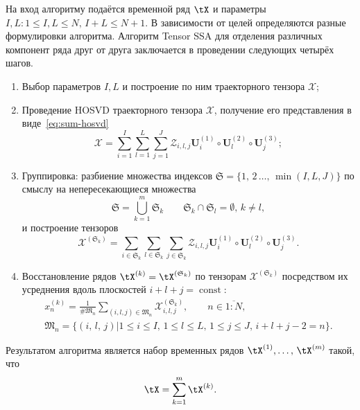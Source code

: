 \documentclass[specialist,
    substylefile = spbu_report.rtx,
    subf,href,colorlinks=true, 12pt]{disser}
\theoremstyle{plain}
\theoremstyle{definition}
\theoremstyle{remark}
\begin{document}
    На вход алгоритму подаётся временной ряд $\tX$ и параметры $I,L: 1\leqslant I,L \leqslant N,\, I + L \leqslant N + 1$.
    В зависимости от целей определяются разные формулировки алгоритма.
    Алгоритм Tensor SSA для отделения различных компонент ряда друг от друга заключается в проведении следующих четырёх шагов.
    \begin{enumerate}
        \item Выбор параметров $I, L$ и построение по ним траекторного тензора $\mathcal{X}$;
        \item Проведение HOSVD траекторного тензора $\mathcal{X}$, получение его представления в виде~\eqref{eq:sum-hosvd}
        \begin{equation}
            \mathcal{X}=\sum_{i=1}^{I} \sum_{l=1}^{L} \sum_{j=1}^{J} \mathcal{Z}_{i,l,j} \mathbf{U}^{(1)}_{i}
            \circ \mathbf{U}^{(2)}_{l} \circ \mathbf{U}^{(3)}_{j};
            \label{eq:trajectory-hosvd}
        \end{equation}
        \item Группировка: разбиение множества индексов $\mathfrak{S}=\{1,\, 2\,\ldots,\, \min(I, L, J)\}$ по смыслу на
        непересекающиеся множества
        \[
            \mathfrak{S}=\bigcup_{k=1}^{m}\mathfrak{S}_k \qquad \mathfrak{S}_k\cap \mathfrak{S}_l =\emptyset,\, k\ne l,
        \]
        и построение тензоров
        \begin{equation*}
            \mathcal{X}^{(\mathfrak{S}_k)}=\sum_{i \in \mathfrak{S}_k} \sum_{l\in \mathfrak{S}_k} \sum_{j\in \mathfrak{S}_k}
            \mathcal{Z}_{i,l,j} \mathbf{U}^{(1)}_{i}\circ \mathbf{U}^{(2)}_{l} \circ \mathbf{U}^{(3)}_{j}.
        \end{equation*}
        \item Восстановление рядов $\tX^{(k)}=\tX^{(\mathfrak{S}_k)}$ по тензорам $\mathcal{X}^{(\mathfrak{S}_k)}$ посредством их усреднения вдоль
        плоскостей $i+l+j=\operatorname{const}$:
        \begin{gather*}
            x^{(k)}_n=\frac{1}{\#\mathfrak{M}_n}\sum_{(i,l,j)\in \mathfrak{M}_n} \mathcal{X}^{(\mathfrak{S}_k)}_{i,l,j},\qquad n\in \overline{1:N},\\
            \mathfrak{M}_n=\{(i,\, l,\, j) | 1\leqslant i \leqslant I,\, 1\leqslant l \leqslant L,\, 1\leqslant j \leqslant J,\, i+l+j-2=n\}.
        \end{gather*}
    \end{enumerate}
    Результатом алгоритма является набор временных рядов $\tX^{(1)},\ldots,\, \tX^{(m)}$ такой, что
    \[
        \tX=\sum_{k=1}^{m}\tX^{(k)}.
    \]
\end{document}
